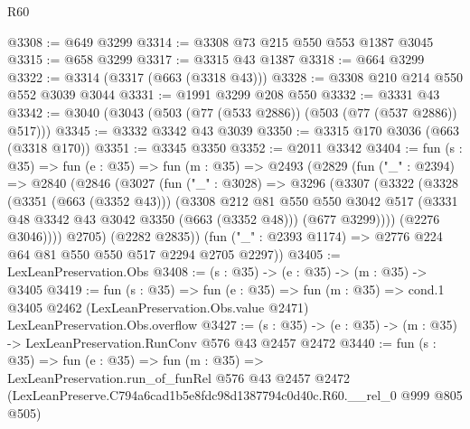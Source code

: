 \begin{lexlean}{R60}
\begin{coremodule}
@3308 := @649 @3299
@3314 := @3308 @73 @215 @550 @553 @1387 @3045
@3315 := @658 @3299
@3317 := @3315 @43 @1387
@3318 := @664 @3299
@3322 := @3314 (@3317 (@663 (@3318 @43)))
@3328 := @3308 @210 @214 @550 @552 @3039 @3044
@3331 := @1991 @3299 @208 @550
@3332 := @3331 @43
@3342 := @3040 (@3043 (@503 (@77 (@533 @2886)) (@503 (@77 (@537 @2886)) @517)))
@3345 := @3332 @3342 @43 @3039
@3350 := @3315 @170 @3036 (@663 (@3318 @170))
@3351 := @3345 @3350
@3352 := @2011 @3342
@3404 := fun (s : @35) =>
  fun (e : @35) =>
  fun (m : @35) =>
  @2493
    (@2829
      (fun ("_" : @2394) =>
      @2840
        (@2846
          (@3027
            (fun ("_" : @3028) =>
            @3296
              (@3307
                (@3322
                  (@3328
                    (@3351 (@663 (@3352 @43)))
                    (@3308
                      @212
                      @81
                      @550
                      @550
                      @3042
                      @517
                      (@3331 @48 @3342 @43 @3042 @3350 (@663 (@3352 @48)))
                      (@677 @3299))))
                (@2276 @3046))))
          @2705)
        (@2282 @2835))
      (fun ("_" : @2393 @1174) => @2776 @224 @64 @81 @550 @550 @517 @2294 @2705 @2297))
@3405 := LexLeanPreservation.Obs
@3408 := (s : @35) -> (e : @35) -> (m : @35) -> @3405
@3419 := fun (s : @35) =>
  fun (e : @35) =>
  fun (m : @35) =>
  cond.{1} @3405 @2462 (LexLeanPreservation.Obs.value @2471) LexLeanPreservation.Obs.overflow
@3427 := (s : @35) -> (e : @35) -> (m : @35) -> LexLeanPreservation.RunConv @576 @43 @2457 @2472
@3440 := fun (s : @35) =>
  fun (e : @35) =>
  fun (m : @35) =>
  LexLeanPreservation.run_of_funRel
    @576
    @43
    @2457
    @2472
    (LexLeanPreserve.C794a6cad1b5e8fdc98d1387794c0d40c.R60.__rel_0 @999 @805 @505)
\end{coremodule}
\end{lexlean}
